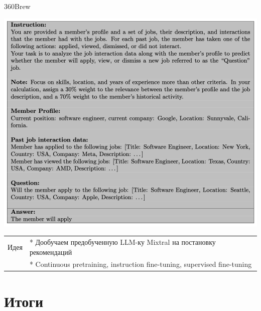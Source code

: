 \documentclass[11pt,aspectratio=169,handout]{beamer}
\begin{document}
\begin{frame}{360Brew \cite{firooz2025360brew}}

\begin{center}
\includegraphics[scale=0.4]{images/360brew_input.png}
\end{center}

\vfill
\begin{small}
\begin{tabular}{l l}
Идея & * Дообучаем предобученную LLM-ку Mixtral на постановку рекомендаций\\
& * Continuous pretraining, instruction fine-tuning, supervised fine-tuning
\end{tabular}
\end{small}

\end{frame}


\section{Итоги}
\end{document}
